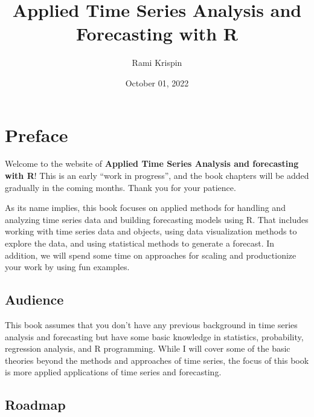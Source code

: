 \documentclass[
  letterpaper,
  DIV=11,
  numbers=noendperiod]{scrreprt}
\title{Applied Time Series Analysis and Forecasting with R}
\author{Rami Krispin}
\date{October 01, 2022}
\renewcommand*\contentsname{Table of contents}
\newcommand\contentsname{Table of contents}
\begin{document}
\maketitle
\ifdefined\Shaded\renewenvironment{Shaded}{\begin{tcolorbox}[breakable, interior hidden, enhanced, borderline west={3pt}{0pt}{shadecolor}, boxrule=0pt, sharp corners, frame hidden]}{\end{tcolorbox}}\fi

\renewcommand*\contentsname{Table of contents}
{
\hypersetup{linkcolor=}
\setcounter{tocdepth}{2}
\tableofcontents
}

\hypertarget{preface}{%
\chapter*{Preface}\label{preface}}

Welcome to the website of \textbf{Applied Time Series Analysis and
forecasting with R}! This is an early ``work in progress'', and the book
chapters will be added gradually in the coming months. Thank you for
your patience.

As its name implies, this book focuses on applied methods for handling
and analyzing time series data and building forecasting models using R.
That includes working with time series data and objects, using data
visualization methods to explore the data, and using statistical methods
to generate a forecast. In addition, we will spend some time on
approaches for scaling and productionize your work by using fun
examples.

\hypertarget{audience}{%
\section*{Audience}\label{audience}}

This book assumes that you don't have any previous background in time
series analysis and forecasting but have some basic knowledge in
statistics, probability, regression analysis, and R programming. While I
will cover some of the basic theories beyond the methods and approaches
of time series, the focus of this book is more applied applications of
time series and forecasting.

\hypertarget{roadmap}{%
\section*{Roadmap}\label{roadmap}}
\end{document}

